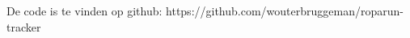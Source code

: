 \documentclass[../main.tex]{subfiles}
\begin{document}
    De code is te vinden op github:
    https://github.com/wouterbruggeman/roparun-tracker
\end{document}
